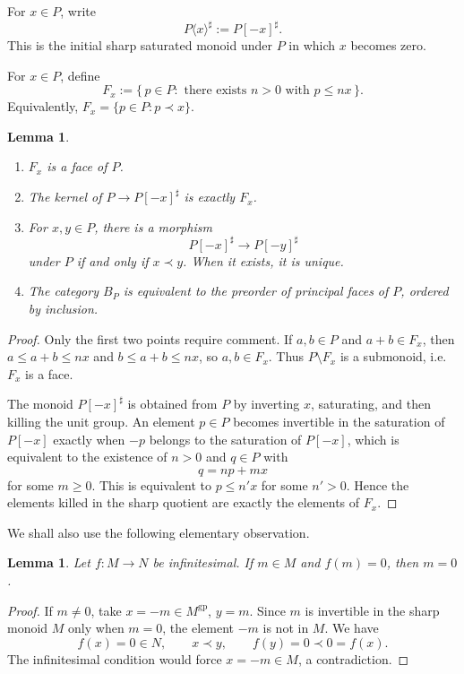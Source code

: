\documentclass{article}
\newtheorem{lemma}[theorem]{Lemma}
\theoremstyle{definition}
\begin{document}
For \(x\in P\), write
\[
P\langle x\rangle^\sharp:=P[-x]^\sharp.
\]
This is the initial sharp saturated monoid under \(P\) in which \(x\) becomes zero.

For \(x\in P\), define
\[
F_x:=\{\,p\in P:\text{ there exists }n>0\text{ with }p\le n x\,\}.
\]
Equivalently, \(F_x=\{p\in P:p\prec x\}\).

\begin{lemma}\label{lem:faces}
\leavevmode
\begin{enumerate}
\item \(F_x\) is a face of \(P\).
\item The kernel of \(P\to P[-x]^\sharp\) is exactly \(F_x\).
\item For \(x,y\in P\), there is a morphism
\[
P[-x]^\sharp\longrightarrow P[-y]^\sharp
\]
under \(P\) if and only if \(x\prec y\).  When it exists, it is unique.
\item The category \(B_P\) is equivalent to the preorder of principal faces of \(P\), ordered by inclusion.
\end{enumerate}
\end{lemma}

\begin{proof}
Only the first two points require comment.  If \(a,b\in P\) and \(a+b\in F_x\), then \(a\le a+b\le n x\) and \(b\le a+b\le n x\), so \(a,b\in F_x\).  Thus \(P\setminus F_x\) is a submonoid, i.e. \(F_x\) is a face.

The monoid \(P[-x]^\sharp\) is obtained from \(P\) by inverting \(x\), saturating, and then killing the unit group.  An element \(p\in P\) becomes invertible in the saturation of \(P[-x]\) exactly when \(-p\) belongs to the saturation of \(P[-x]\), which is equivalent to the existence of \(n>0\) and \(q\in P\) with
\[
q=np+mx
\]
for some \(m\ge 0\).  This is equivalent to \(p\le n'x\) for some \(n'>0\).  Hence the elements killed in the sharp quotient are exactly the elements of \(F_x\).
\end{proof}

We shall also use the following elementary observation.

\begin{lemma}\label{lem:infinitesimal-kernel}
Let \(f:M\to N\) be infinitesimal.  If \(m\in M\) and \(f(m)=0\), then \(m=0\).
\end{lemma}

\begin{proof}
If \(m\neq 0\), take \(x=-m\in M^{\mathrm{gp}}\), \(y=m\).  Since \(m\) is invertible in the sharp monoid \(M\) only when \(m=0\), the element \(-m\) is not in \(M\).  We have
\[
f(x)=0\in N,\qquad x\prec y,\qquad f(y)=0\prec 0=f(x).
\]
The infinitesimal condition would force \(x=-m\in M\), a contradiction.
\end{proof}
\end{document}
